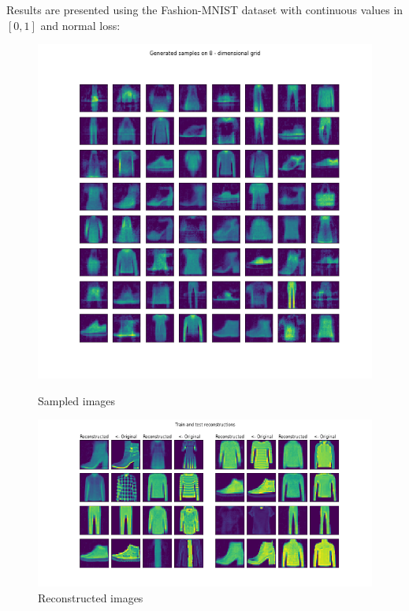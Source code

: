 \documentclass[12pt, english]{article}
\begin{document}
\vspace{5mm}

\par Results are presented using the Fashion-MNIST dataset with continuous values in $[0, 1]$ and normal loss:

\vspace{4mm}

\begin{figure}[ht] 
  \label{fig:auto_encoder_results} 
  \begin{minipage}[b]{0.5\linewidth}
    \centering
    \includegraphics[width=.65\linewidth]{gen/generated_samples_fashion_mnist_dense_vae.png} 
    \caption{Sampled images} 
  \end{minipage}%
  \begin{minipage}[b]{0.5\linewidth}
    \centering
    \includegraphics[width=.95\linewidth]{reco/reconstrunction_samples_fashion_mnist_dense_vae.png} 
    \caption{Reconstructed images} 
  \end{minipage} 
\end{figure}

\vspace{4mm}
\end{document}
